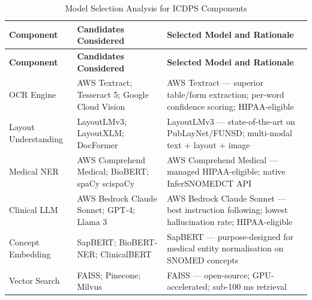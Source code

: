 \begin{longtable}{
|>{\raggedright\arraybackslash}p{2.7cm}
|>{\raggedright\arraybackslash}p{4.5cm}
|>{\raggedright\arraybackslash}p{7cm}|}

\caption{Model Selection Analysis for ICDPS Components}
\label{tab:model_selection}
\\

\hline

\textbf{Component} &
\textbf{Candidates Considered} &
\textbf{Selected Model and Rationale}
\\

\hline
\endfirsthead

\hline

\textbf{Component} &
\textbf{Candidates Considered} &
\textbf{Selected Model and Rationale}
\\

\hline
\endhead

OCR Engine
&
AWS Textract; Tesseract 5; Google Cloud Vision
&
AWS Textract --- superior table/form extraction; per-word confidence scoring; HIPAA-eligible
\\

\hline

Layout Understanding
&
LayoutLMv3; LayoutXLM; DocFormer
&
LayoutLMv3 --- state-of-the-art on PubLayNet/FUNSD; multi-modal text + layout + image
\\

\hline

Medical NER
&
AWS Comprehend Medical; BioBERT; spaCy scispaCy
&
AWS Comprehend Medical --- managed HIPAA-eligible; native InferSNOMEDCT API
\\

\hline

Clinical LLM
&
AWS Bedrock Claude Sonnet; GPT-4; Llama 3
&
AWS Bedrock Claude Sonnet --- best instruction following; lowest hallucination rate; HIPAA-eligible
\\

\hline

Concept Embedding
&
SapBERT; BioBERT-NER; ClinicalBERT
&
SapBERT --- purpose-designed for medical entity normalisation on SNOMED concepts
\\

\hline

Vector Search
&
FAISS; Pinecone; Milvus
&
FAISS --- open-source; GPU-accelerated; sub-100 ms retrieval
\\

\hline

\end{longtable}

